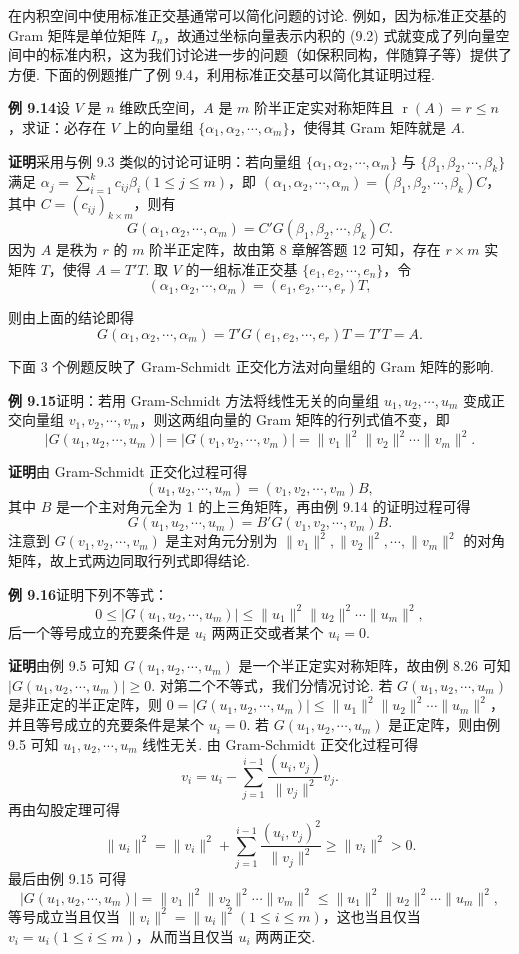 \documentclass[UTF8, 12pt, fontset=fandol, oneside]{ctexart}
\begin{document}
在内积空间中使用标准正交基通常可以简化问题的讨论. 例如，因为标准正交基的 Gram 矩阵是单位矩阵 $I_n$，故通过坐标向量表示内积的 (9.2) 式就变成了列向量空间中的标准内积，这为我们讨论进一步的问题（如保积同构，伴随算子等）提供了方便. 下面的例题推广了例 9.4，利用标准正交基可以简化其证明过程.

\noindent\textbf{例 9.14}\quad 设 $V$ 是 $n$ 维欧氏空间，$A$ 是 $m$ 阶半正定实对称矩阵且 $\operatorname{r}(A)=r\le n$，求证：必存在 $V$ 上的向量组 $\{\alpha_1,\alpha_2,\cdots,\alpha_m\}$，使得其 Gram 矩阵就是 $A$.

\noindent\textbf{证明}\quad 采用与例 9.3 类似的讨论可证明：若向量组 $\{\alpha_1,\alpha_2,\cdots,\alpha_m\}$ 与 $\{\beta_1,\beta_2,\cdots,\beta_k\}$ 满足 $\alpha_j=\sum_{i=1}^k c_{ij}\beta_i(1\le j\le m)$，即 $(\alpha_1,\alpha_2,\cdots,\alpha_m)=(\beta_1,\beta_2,\cdots,\beta_k)C$，其中 $C=(c_{ij})_{k\times m}$，则有
\[
G(\alpha_1,\alpha_2,\cdots,\alpha_m)=C'G(\beta_1,\beta_2,\cdots,\beta_k)C.
\]
因为 $A$ 是秩为 $r$ 的 $m$ 阶半正定阵，故由第 8 章解答题 12 可知，存在 $r\times m$ 实矩阵 $T$，使得 $A=T'T$. 取 $V$ 的一组标准正交基 $\{e_1,e_2,\cdots,e_n\}$，令
\[
(\alpha_1,\alpha_2,\cdots,\alpha_m)=(e_1,e_2,\cdots,e_r)T,
\]

则由上面的结论即得
\[
G(\alpha_1,\alpha_2,\cdots,\alpha_m)=T'G(e_1,e_2,\cdots,e_r)T=T'T=A.
\]

下面 3 个例题反映了 Gram-Schmidt 正交化方法对向量组的 Gram 矩阵的影响.

\noindent\textbf{例 9.15}\quad 证明：若用 Gram-Schmidt 方法将线性无关的向量组 $u_1,u_2,\cdots,u_m$ 变成正交向量组 $v_1,v_2,\cdots,v_m$，则这两组向量的 Gram 矩阵的行列式值不变，即
\[
|G(u_1,u_2,\cdots,u_m)|=|G(v_1,v_2,\cdots,v_m)|=\|v_1\|^2\|v_2\|^2\cdots\|v_m\|^2.
\]

\noindent\textbf{证明}\quad 由 Gram-Schmidt 正交化过程可得
\[
(u_1,u_2,\cdots,u_m)=(v_1,v_2,\cdots,v_m)B,
\]
其中 $B$ 是一个主对角元全为 1 的上三角矩阵，再由例 9.14 的证明过程可得
\[
G(u_1,u_2,\cdots,u_m)=B'G(v_1,v_2,\cdots,v_m)B.
\]
注意到 $G(v_1,v_2,\cdots,v_m)$ 是主对角元分别为 $\|v_1\|^2,\|v_2\|^2,\cdots,\|v_m\|^2$ 的对角矩阵，故上式两边同取行列式即得结论.

\noindent\textbf{例 9.16}\quad 证明下列不等式：
\[
0\le |G(u_1,u_2,\cdots,u_m)|\le \|u_1\|^2\|u_2\|^2\cdots\|u_m\|^2,
\]
后一个等号成立的充要条件是 $u_i$ 两两正交或者某个 $u_i=0$.

\noindent\textbf{证明}\quad 由例 9.5 可知 $G(u_1,u_2,\cdots,u_m)$ 是一个半正定实对称矩阵，故由例 8.26 可知 $|G(u_1,u_2,\cdots,u_m)|\ge 0$. 对第二个不等式，我们分情况讨论. 若 $G(u_1,u_2,\cdots,u_m)$ 是非正定的半正定阵，则 $0=|G(u_1,u_2,\cdots,u_m)|\le \|u_1\|^2\|u_2\|^2\cdots\|u_m\|^2$，并且等号成立的充要条件是某个 $u_i=0$. 若 $G(u_1,u_2,\cdots,u_m)$ 是正定阵，则由例 9.5 可知 $u_1,u_2,\cdots,u_m$ 线性无关. 由 Gram-Schmidt 正交化过程可得
\[
v_i=u_i-\sum_{j=1}^{i-1}\frac{(u_i,v_j)}{\|v_j\|^2}v_j.
\]
再由勾股定理可得
\[
\|u_i\|^2=\|v_i\|^2+\sum_{j=1}^{i-1}\frac{(u_i,v_j)^2}{\|v_j\|^2}\ge \|v_i\|^2>0.
\]
最后由例 9.15 可得
\[
|G(u_1,u_2,\cdots,u_m)|=\|v_1\|^2\|v_2\|^2\cdots\|v_m\|^2
\le \|u_1\|^2\|u_2\|^2\cdots\|u_m\|^2,
\]
等号成立当且仅当 $\|v_i\|^2=\|u_i\|^2(1\le i\le m)$，这也当且仅当 $v_i=u_i(1\le i\le m)$，从而当且仅当 $u_i$ 两两正交.
\end{document}
